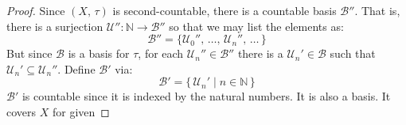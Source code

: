 \documentclass{article}
\theoremstyle{plain}
\theoremstyle{normal}
\begin{document}
        \begin{proof}
            Since $(X,\,\tau)$ is second-countable, there is a countable basis
            $\mathcal{B}''$. That is, there is a surjection
            $\mathcal{U}'':\mathbb{N}\rightarrow\mathcal{B}''$ so that we may
            list the elements as:
            \begin{equation}
                \mathcal{B}''=
                \{\mathcal{U}_{0}'',\,\dots,\,\mathcal{U}_{n}'',\,\dots\,\}
            \end{equation}
            But since $\mathcal{B}$ is a basis for $\tau$, for
            each $\mathcal{U}_{n}''\in\mathcal{B}''$ there is a
            $\mathcal{U}_{n}'\in\mathcal{B}$ such that
            $\mathcal{U}_{n}'\subseteq\mathcal{U}_{n}''$. Define $\mathcal{B}'$
            via:
            \begin{equation}
                \mathcal{B}'=\{\,\mathcal{U}_{n}'\;|\;n\in\mathbb{N}\,\}
            \end{equation}
            $\mathcal{B}'$ is countable since it is indexed by the natural
            numbers. It is also a basis. It covers $X$ for given
        \end{proof}
\end{document}
